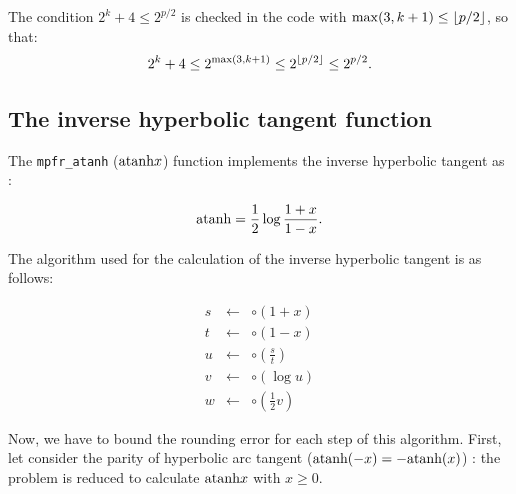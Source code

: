 \documentclass[12pt]{amsart}
\def\n{\textnormal}
\begin{document}
The condition $2^k+4 \leq 2^{p/2}$ is checked in the code with
${\rm max}(3,k+1) \leq \lfloor p/2 \rfloor$, so that:
\[2^k+4 \leq 2^{{\rm max}(3,k+1)} \leq 2^{\lfloor p/2 \rfloor} \leq 2^{p/2}.\]

\subsection{The inverse hyperbolic tangent function}

The {\tt mpfr\_atanh} ($\n{atanh}{x}$) function implements the inverse
hyperbolic tangent as :

\[\n{atanh} = \frac{1}{2} \log \frac{1+x}{1-x}.\]

The algorithm used for the calculation of the inverse hyperbolic tangent is
as follows:

\begin{eqnarray}\nonumber
s&\leftarrow&\circ(1+x)\\\nonumber
t&\leftarrow&\circ(1-x)\\\nonumber
u&\leftarrow&\circ(\frac{s}{t})\\\nonumber
v&\leftarrow&\circ(\log u)\\\nonumber
w&\leftarrow&\circ(\frac{1}{2} v)
\end{eqnarray}


Now, we have to bound the rounding error for each step of this
algorithm. First, let consider the parity of hyperbolic arc tangent
($\n{atanh}(-x)=-\n{atanh}(x)$) : the problem is reduced to calculate
$\n{atanh} x$ with $x \geq 0$.
\end{document}
